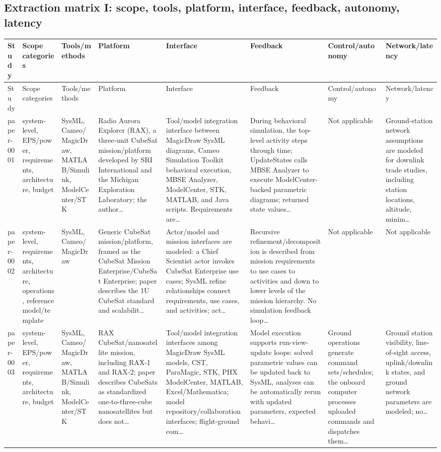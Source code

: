 \documentclass[10pt]{article}
\begin{document}
\begin{landscape}
\section*{Extraction matrix I: scope, tools, platform, interface, feedback, autonomy, latency}
\scriptsize
\setlength{\tabcolsep}{2pt}
\begin{longtable}{p{1.1cm}p{3.1cm}p{2.5cm}p{3.3cm}p{4.0cm}p{3.5cm}p{2.8cm}p{2.8cm}}
\toprule
Study & Scope categories & Tools/methods & Platform & Interface & Feedback & Control/autonomy & Network/latency\\
\midrule
\endfirsthead
\toprule
Study & Scope categories & Tools/methods & Platform & Interface & Feedback & Control/autonomy & Network/latency\\
\midrule
\endhead
paper-0001 & system-level, EPS/power, requirements, architecture, budget & SysML, Cameo/MagicDraw, MATLAB/Simulink, ModelCenter/STK & Radio Aurora Explorer (RAX), a three-unit CubeSat mission/platform developed by SRI International and the Michigan Exploration Laboratory; the author… & Tool/model integration interface between MagicDraw SysML diagrams, Cameo Simulation Toolkit behavioral execution, MBSE Analyzer, ModelCenter, STK, MATLAB, and Java scripts. Requirements are… & During behavioral simulation, the top-level activity steps through time; UpdateStates calls MBSE Analyzer to execute ModelCenter-backed parametric diagrams; returned state values… & Not applicable & Ground-station network assumptions are modeled for downlink trade studies, including station locations, altitude, minim… \\
paper-0002 & system-level, requirements, architecture, operations, reference model/template & SysML, Cameo/MagicDraw & Generic CubeSat mission/platform, framed as the CubeSat Mission Enterprise/CubeSat Enterprise; paper describes the 1U CubeSat standard and scalabilit… & Actor/model and mission interfaces are modeled: a Chief Scientist actor invokes CubeSat Enterprise use cases; SysML refine relationships connect requirements, use cases, and activities; act… & Recursive refinement/decomposition is described from mission requirements to use cases to activities and down to lower levels of the mission hierarchy. No simulation feedback loop… & Not applicable & Not applicable \\
paper-0003 & system-level, EPS/power, requirements, architecture, budget & SysML, Cameo/MagicDraw, MATLAB/Simulink, ModelCenter/STK & RAX CubeSat/nanosatellite mission, including RAX-1 and RAX-2; paper describes CubeSats as standardized one-to-three-cube nanosatellites but does not… & Tool/model integration interfaces among MagicDraw SysML models, CST, ParaMagic, STK, PHX ModelCenter, MATLAB, Excel/Mathematica; model repository/collaboration interfaces; flight-ground com… & Model execution supports run-view-update loops: solved parametric values can be updated back to SysML, analyses can be automatically rerun with updated parameters, expected behavi… & Ground operations generate command sets/schedules; the onboard computer processes uploaded commands and dispatches them… & Ground station visibility, line-of-sight access, uplink/downlink states, and ground network parameters are modeled; no… \\

\end{longtable}
\end{landscape}
\end{document}

